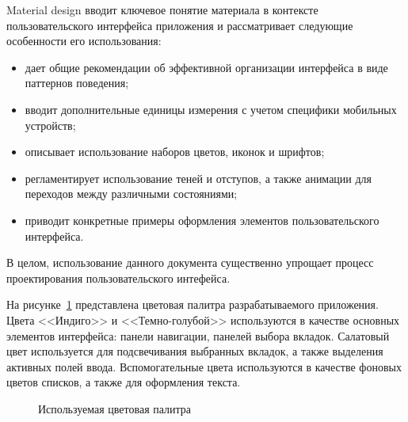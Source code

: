 Material design вводит ключевое понятие материала в контексте
пользовательского интерфейса приложения и рассматривает следующие
особенности его использования:
\begin{itemize}
\item дает общие рекомендации об эффективной организации интерфейса
  в виде паттернов поведения;
\item вводит дополнительные единицы измерения с учетом специфики
  мобильных устройств;
\item описывает использование наборов цветов, иконок и шрифтов;
\item регламентирует использование теней и отступов,
  а также анимации для переходов между различными состояниями;
\item приводит конкретные примеры оформления элементов
  пользовательского интерфейса.
\end{itemize}
В целом, использование данного документа существенно упрощает процесс
проектирования пользовательского интефейса.

На рисунке~\ref{fig:design_colors} представлена цветовая палитра
разрабатываемого приложения. Цвета <<Индиго>> и <<Темно-голубой>>
используются в качестве основных элементов интерфейса:
панели навигации, панелей выбора вкладок.
Салатовый цвет используется для подсвечивания выбранных вкладок,
а также выделения активных полей ввода.
Вспомогательные цвета используются в качестве фоновых цветов списков,
а также для оформления текста.

\begin{figure}[h!]
  \centering
  \caption{Используемая цветовая палитра}
  \label{fig:design_colors}
\end{figure}

